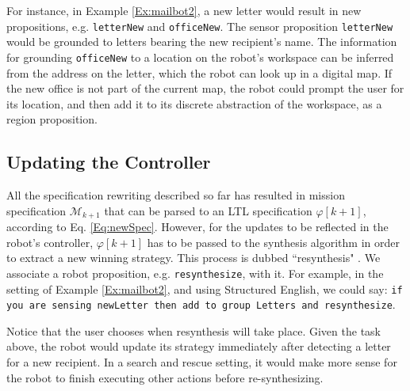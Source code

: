 For instance, in Example \ref{Ex:mailbot2}, a new letter would result in new propositions, e.g. \texttt{letterNew} and \texttt{officeNew}. The sensor proposition \texttt{letterNew} would be grounded to letters bearing the new recipient's name. The information for grounding \texttt{officeNew} to a location on the robot's workspace can be inferred from the address on the letter, which the robot can look up in a digital map. If the new office is not part of the current map, the robot could prompt the user for its location, and then add it to its discrete abstraction of the workspace, as a region proposition.

\subsection{Updating the Controller}

All the specification rewriting described so far has resulted in mission specification $\mathcal{M}_{k+1}$ that can be parsed to an LTL specification $\varphi [k+1]$, according to Eq. \eqref{Eq:newSpec}. However, for the updates to be reflected in the robot's controller, $\varphi [k+1]$ has to be passed to the synthesis algorithm in order to extract a new winning strategy. This process is dubbed ``resynthesis" \cite{BingxinRSS2012}. We associate a robot proposition, e.g. \texttt{resynthesize}, with it. For example, in the setting of Example \ref{Ex:mailbot2}, and using Structured English, we could say:
\texttt{if you are sensing newLetter then add to group Letters and resynthesize}. 

Notice that the user chooses when resynthesis will take place. Given the task above, the robot would update its strategy immediately after detecting a letter for a new recipient. In a search and rescue setting, it would make more sense for the robot to finish executing other actions before re-synthesizing.

